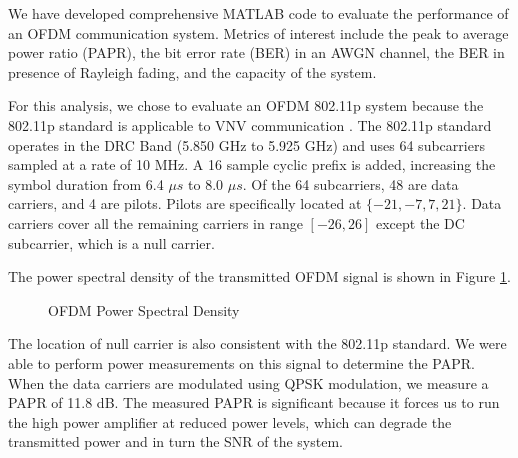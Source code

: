 \documentclass[conference]{IEEEtran}
\begin{document}
      We have developed comprehensive MATLAB code to evaluate the performance of an OFDM communication system. Metrics of interest include the peak to average power ratio (PAPR), the bit error rate (BER) in an AWGN channel, the BER in presence of Rayleigh fading, and the capacity of the system.
      
      For this analysis, we chose to evaluate an OFDM 802.11p system because the 802.11p standard is applicable to VNV communication \cite{802_11p_abdelgader}. The 802.11p standard operates in the DRC Band (5.850 GHz to 5.925 GHz) and uses 64 subcarriers sampled at a rate of 10 MHz. A 16 sample cyclic prefix is added, increasing the symbol duration from 6.4 ${\mu}s$ to 8.0 ${\mu}s$. Of the 64 subcarriers, 48 are data carriers, and 4 are pilots. Pilots are specifically located at $\{-21, -7, 7, 21\}$. Data carriers cover all the remaining carriers in range $[-26, 26]$ except the DC subcarrier, which is a null carrier.
      
    The power spectral density of the transmitted OFDM signal is shown in Figure \ref{fig::ofdm_psd}.
    
    \begin{figure}[H]
    		\centering
    		\caption{OFDM Power Spectral Density}
    		\label{fig::ofdm_psd}
	\end{figure}
    
    The location of null carrier is also consistent with the 802.11p standard. We were able to perform power measurements on this signal to determine the PAPR. When the data carriers are modulated using QPSK modulation, we measure a PAPR of 11.8 dB. The measured PAPR is significant because it forces us to run the high power amplifier at reduced power levels, which can degrade the transmitted power and in turn the SNR of the system.
    
\end{document}
